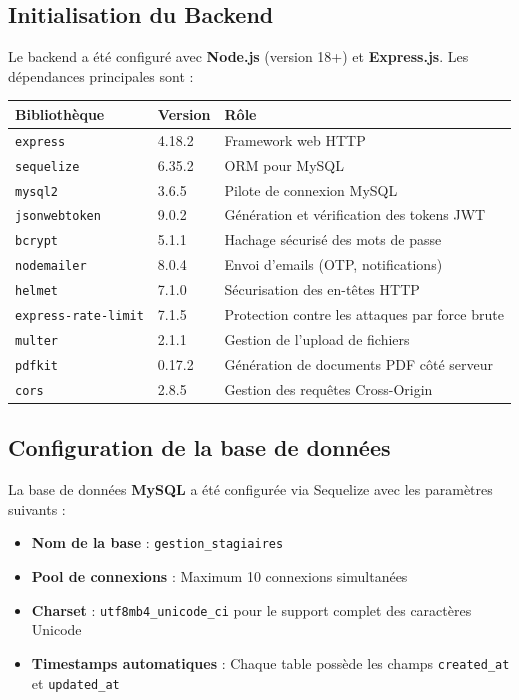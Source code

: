 \subsection{Initialisation du Backend}
Le backend a été configuré avec \textbf{Node.js} (version 18+) et \textbf{Express.js}. Les dépendances principales sont :

\begin{center}
\begin{tabular}{|l|l|p{6cm}|}
\hline
\textbf{Bibliothèque} & \textbf{Version} & \textbf{Rôle} \\ \hline
\texttt{express} & 4.18.2 & Framework web HTTP \\ \hline
\texttt{sequelize} & 6.35.2 & ORM pour MySQL \\ \hline
\texttt{mysql2} & 3.6.5 & Pilote de connexion MySQL \\ \hline
\texttt{jsonwebtoken} & 9.0.2 & Génération et vérification des tokens JWT \\ \hline
\texttt{bcrypt} & 5.1.1 & Hachage sécurisé des mots de passe \\ \hline
\texttt{nodemailer} & 8.0.4 & Envoi d'emails (OTP, notifications) \\ \hline
\texttt{helmet} & 7.1.0 & Sécurisation des en-têtes HTTP \\ \hline
\texttt{express-rate-limit} & 7.1.5 & Protection contre les attaques par force brute \\ \hline
\texttt{multer} & 2.1.1 & Gestion de l'upload de fichiers \\ \hline
\texttt{pdfkit} & 0.17.2 & Génération de documents PDF côté serveur \\ \hline
\texttt{cors} & 2.8.5 & Gestion des requêtes Cross-Origin \\ \hline
\end{tabular}
\end{center}

\subsection{Configuration de la base de données}
La base de données \textbf{MySQL} a été configurée via Sequelize avec les paramètres suivants :
\begin{itemize}
    \item \textbf{Nom de la base} : \texttt{gestion\_stagiaires}
    \item \textbf{Pool de connexions} : Maximum 10 connexions simultanées
    \item \textbf{Charset} : \texttt{utf8mb4\_unicode\_ci} pour le support complet des caractères Unicode
    \item \textbf{Timestamps automatiques} : Chaque table possède les champs \texttt{created\_at} et \texttt{updated\_at}
\end{itemize}

